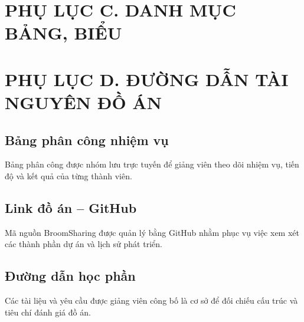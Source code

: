 \clearpage
\section*{PHỤ LỤC C. DANH MỤC BẢNG, BIỂU}
\printappendixtables

\clearpage
\section*{PHỤ LỤC D. ĐƯỜNG DẪN TÀI NGUYÊN ĐỒ ÁN}

\subsection*{Bảng phân công nhiệm vụ}
Bảng phân công được nhóm lưu trực tuyến để giảng viên theo dõi nhiệm vụ, tiến độ và kết quả của từng thành viên.
\begin{center}
{\Large\bfseries
{}
}
\end{center}

\subsection*{Link đồ án -- GitHub}
Mã nguồn BroomSharing được quản lý bằng GitHub nhằm phục vụ việc xem xét các thành phần dự án và lịch sử phát triển.
\begin{center}
{\Large\bfseries
{}
}
\end{center}

\subsection*{Đường dẫn học phần}
Các tài liệu và yêu cầu được giảng viên công bố là cơ sở để đối chiếu cấu trúc và tiêu chí đánh giá đồ án.
\begin{center}
{\large\bfseries
{}
}
\end{center}

